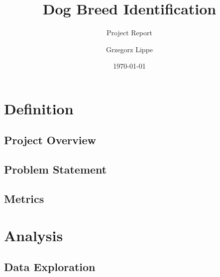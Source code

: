 \documentclass[paper=A4, parskip=half]{scrartcl}
\title{Dog Breed Identification}
\subtitle{Project Report}
\author{Grzegorz Lippe}
\date{\today}
\begin{document}
\maketitle

\section*{Definition}

\subsection*{Project Overview}


\subsection*{Problem Statement}


\subsection*{Metrics}


\section*{Analysis}

\subsection*{Data Exploration}

\end{document}
